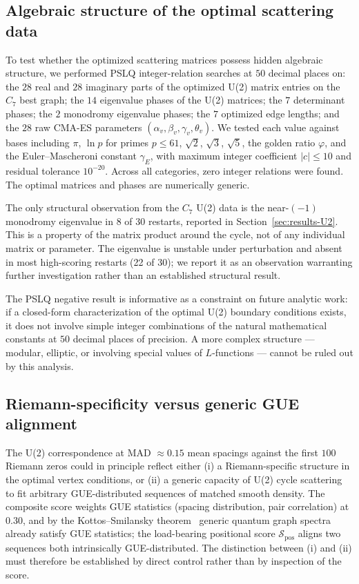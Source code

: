 \documentclass[cntp]{ipart}
\theoremstyle{plain}
\theoremstyle{remark}
\begin{document}
\subsection{Algebraic structure of the optimal scattering data}
\label{sec:results-pslq}

To test whether the optimized scattering matrices possess hidden algebraic structure, we performed PSLQ integer-relation searches at $50$ decimal places on: the $28$ real and $28$ imaginary parts of the optimized U(2) matrix entries on the $C_7$ best graph; the $14$ eigenvalue phases of the U(2) matrices; the $7$ determinant phases; the $2$ monodromy eigenvalue phases; the $7$ optimized edge lengths; and the $28$ raw CMA-ES parameters $(\alpha_v, \beta_v, \gamma_v, \theta_v)$. We tested each value against bases including $\pi$, $\ln p$ for primes $p \leq 61$, $\sqrt{2}$, $\sqrt{3}$, $\sqrt{5}$, the golden ratio $\varphi$, and the Euler--Mascheroni constant $\gamma_E$, with maximum integer coefficient $|c| \leq 10$ and residual tolerance $10^{-20}$. Across all categories, zero integer relations were found. The optimal matrices and phases are numerically generic.

The only structural observation from the $C_7$ U(2) data is the near-$(-1)$ monodromy eigenvalue in 8 of 30 restarts, reported in Section~\ref{sec:results-U2}. This is a property of the matrix product around the cycle, not of any individual matrix or parameter. The eigenvalue is unstable under perturbation and absent in most high-scoring restarts (22 of 30); we report it as an observation warranting further investigation rather than an established structural result.

The PSLQ negative result is informative as a constraint on future analytic work: if a closed-form characterization of the optimal U(2) boundary conditions exists, it does not involve simple integer combinations of the natural mathematical constants at $50$ decimal places of precision. A more complex structure --- modular, elliptic, or involving special values of $L$-functions --- cannot be ruled out by this analysis.

\subsection{Riemann-specificity versus generic GUE alignment}
\label{sec:results-surrogate}

The U(2) correspondence at MAD $\approx 0.15$ mean spacings against the first $100$ Riemann zeros could in principle reflect either (i) a Riemann-specific structure in the optimal vertex conditions, or (ii) a generic capacity of U(2) cycle scattering to fit arbitrary GUE-distributed sequences of matched smooth density. The composite score weights GUE statistics (spacing distribution, pair correlation) at $0.30$, and by the Kottos--Smilansky theorem~\cite{r4} generic quantum graph spectra already satisfy GUE statistics; the load-bearing positional score $\mathcal{S}_{\mathrm{pos}}$ aligns two sequences both intrinsically GUE-distributed. The distinction between (i) and (ii) must therefore be established by direct control rather than by inspection of the score.
\end{document}
